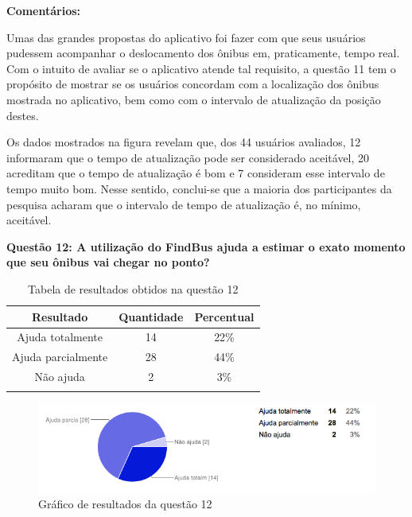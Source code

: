 \textbf{Comentários:}

Umas das grandes propostas do aplicativo foi fazer com que seus usuários pudessem acompanhar o deslocamento dos ônibus em, praticamente, tempo real. Com o intuito de avaliar se o aplicativo atende tal requisito, a questão 11 tem o propósito de mostrar se os usuários concordam com a localização dos ônibus mostrada no aplicativo, bem como com o intervalo de atualização da posição destes. 
	
Os dados mostrados na figura  revelam que, dos 44 usuários avaliados, 12 informaram que o tempo de atualização pode ser considerado aceitável, 20 acreditam que o tempo de atualização é bom e 7 consideram esse intervalo de tempo muito bom. Nesse sentido, conclui-se que a maioria dos participantes da pesquisa acharam que o intervalo de tempo de atualização é, no mínimo, aceitável.\newline

\textbf{Questão 12: A utilização do FindBus ajuda a estimar o exato momento que seu ônibus vai chegar no ponto?}

\begin{center}
\begin{longtable}{c|c|c}
\hline
    \multicolumn{1}{c}{\textbf{Resultado}} & \multicolumn{1}{c}{\textbf{Quantidade}} & \multicolumn{1}{c}{\textbf{Percentual}} \\
\hline
    Ajuda totalmente & 14 &  22\%\\
    \hline
    Ajuda parcialmente & 28 & 44\%\\
    \hline
    Não ajuda & 2 &  3\%\\
    \hline

\caption{Tabela de resultados obtidos na questão 12}
\label{tabq12}
\end{longtable}
\end{center}


\begin{figure}[h]
\begin{center}
  \includegraphics[width=15cm]{images/graficos/questao12.png}
  \caption{Gráfico de resultados da questão 12}
  \label{fig:questao12}
\end{center}
\end{figure}

